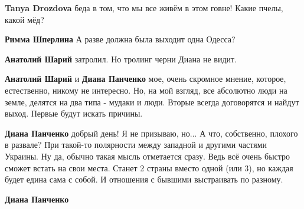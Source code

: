 \begin{itemize}
\begin{itemize}
\textbf{Tanya Drozdova} беда в том, что мы все живём в этом говне! Какие пчелы, какой мёд?

 
\textbf{Римма Шперлина} А разве должна была выходит одна Одесса?

 
\textbf{Анатолий Шарий} затролил. Но тролинг черни Диана не видит.

 
\textbf{Анатолий Шарий} и \textbf{Диана Панченко} мое, очень скромное мнение,
которое, естественно, никому не интересно. Но, на мой взгляд, все абсолютно
люди на земле, делятся на два типа - мудаки и люди. Вторые всегда договорятся и
найдут выход. Первые будут искать причины.

 
\textbf{Диана Панченко} добрый день! Я не призываю, но... А что, собственно,
плохого в развале? При такой-то полярности между западной и другими частями
Украины. Ну да, обычно такая мысль отметается сразу. Ведь всё очень быстро
сможет встать на свои места. Станет 2 страны вместо одной (или 3), но каждая
будет едина сама с собой. И отношения с бывшими выстраивать по разному.

 
\textbf{Диана Панченко} 


\end{itemize}
\end{itemize}
